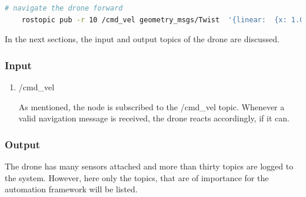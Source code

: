 	\begin{lstlisting}[language=bash, caption= Drone navigation command, label=lst:drone_cmd]
	# navigate the drone forward
    rostopic pub -r 10 /cmd_vel geometry_msgs/Twist  '{linear:  {x: 1.0, y: 0.0, z: 0.0}, angular: {x: 0.0,y: 0.0,z: 0.0}}'
	\end{lstlisting}
	
	In the next sections, the input and output topics of the drone are discussed. 
	
	\subsubsection{Input}
	
	\begin{enumerate}
	\item{/cmd\_vel}
	
	As mentioned, the node is subscribed to the /cmd\_vel topic. Whenever a valid navigation message is received, the drone reacts accordingly, 
	if it can. 
	
	\end{enumerate}
	
	\subsubsection{Output}\label{simout}
	
	The drone has many sensors attached and more than thirty topics are logged to the system. However, here only the topics, that are of importance 
	for the automation framework will be listed. 
	
